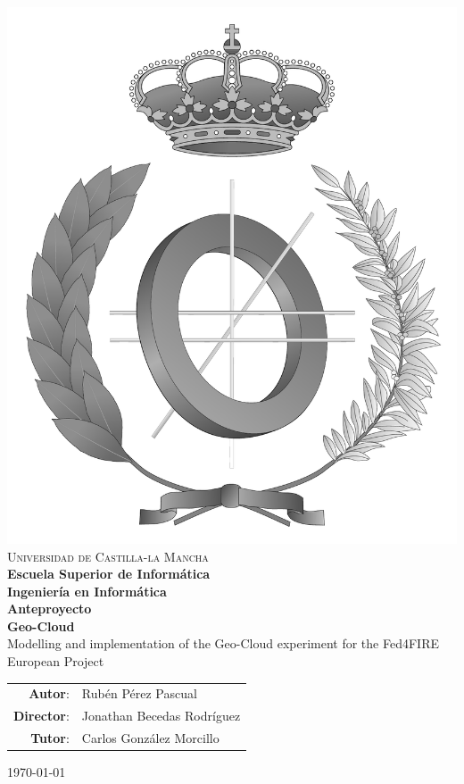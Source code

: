 \documentclass[a4paper,spanish,11pt,twoside]{article}
\begin{document}
\renewcommand*{\thepage}{\roman{page}}
\begin{titlepage}
\begin{center}
  \includegraphics[width=.3\textwidth]{logos/emblema_informatica-gray.pdf} \\
  \vspace*{0,5cm} {\Large \textsc{Universidad de Castilla-la Mancha\\}}
  \vspace{3mm}
  {\Large \textbf{Escuela Superior de Informática}}  \\
  \vspace{1,3cm}
  {\Large \textbf{Ingeniería en Informática}}\\
  \vspace{1cm}
  {\Large \textbf{Anteproyecto}} \\
  \vspace{1,3cm}
  \LARGE{\textbf{Geo-Cloud}\\Modelling and implementation of the Geo-Cloud experiment for the Fed4FIRE European Project}

\end{center}
\vspace{1.0cm}
\begin{table}[!h]
  \Large
  \begin{tabular}{rl}
      \textbf{Autor}: & Rubén Pérez Pascual \\
      \textbf{Director}: & Jonathan Becedas Rodríguez \\
      \textbf{Tutor}: & Carlos González Morcillo
  \end{tabular}
\end{table}
\begin{flushright}
{\large \today}
\end{flushright}
\end{titlepage}
\end{document}
